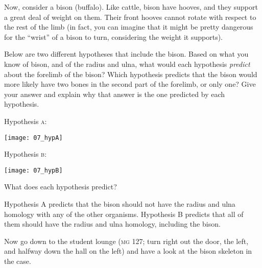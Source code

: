 \documentclass[12pt, hidelinks]{exam}
\newcommand*\AnswerBox[2]{%
    \parbox[t][#1]{0.92\textwidth}{%
    \begin{solution}#2\end{solution}}
    \vspace{\stretch{1}}
}
\begin{document}
\begin{questions}

Now, consider a bison (buffalo). Like cattle, bison have hooves, and they
support a great deal of weight on them. Their front hooves cannot rotate
with respect to the rest of the limb (in fact, you can imagine that it
might be pretty dangerous for the ``wrist'' of a bison to turn,
considering the weight it supports).

Below are two different hypotheses that include the bison. Based 
on what you know of bison, and of the radius and ulna,
what would each hypothesis \emph{predict} about the forelimb of
the bison? Which hypothesis predicts that the bison would more
likely have two bones in the second part of the forelimb, or only one?
Give your answer and explain why that answer is the one predicted by
each hypothesis.

\begin{multicols}{2}

	Hypothesis \textsc{a:} \medskip
	
	\texttt{[image: 07\_hypA]}

\columnbreak

	Hypothesis \textsc{b:} \medskip
	
	\texttt{[image: 07\_hypB]} 
	
	\vspace*{\baselineskip}

\end{multicols}

\question
What does each hypothesis predict?

\AnswerBox{5\baselineskip}{Hypothesis A predicts that the bison should not have the radius and ulna homology with any of the other organisms. Hypothesis B predicts that all of them should have the radius
and ulna homology, including the bison.}

Now go down to the student lounge (\textsc{mg} 127; turn right out the door, 
the left, and halfway down the hall on the left) and have a look at the bison
skeleton in the case. 


\end{questions}
\end{document}
